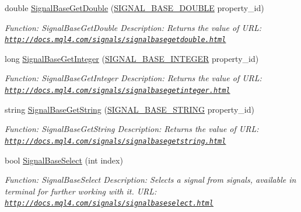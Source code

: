 \begin{DoxyCompactItemize}
double \hyperlink{class_m_q_l4_c_sharp_1_1_base_1_1_m_q_l_base_a75263c5390bf4f75c049212f66ae7d75}{Signal\+Base\+Get\+Double} (\hyperlink{namespace_m_q_l4_c_sharp_1_1_base_1_1_enums_ac14c82f52744d1785a379103a37ba46e}{S\+I\+G\+N\+A\+L\+\_\+\+B\+A\+S\+E\+\_\+\+D\+O\+U\+B\+LE} property\+\_\+id)
\begin{DoxyCompactList}\small\item\em Function\+: Signal\+Base\+Get\+Double Description\+: Returns the value of U\+RL\+: \href{http://docs.mql4.com/signals/signalbasegetdouble.html}{\tt http\+://docs.\+mql4.\+com/signals/signalbasegetdouble.\+html} \end{DoxyCompactList}\item 
long \hyperlink{class_m_q_l4_c_sharp_1_1_base_1_1_m_q_l_base_ae5f293ada0ea19c739982db32e8a2e27}{Signal\+Base\+Get\+Integer} (\hyperlink{namespace_m_q_l4_c_sharp_1_1_base_1_1_enums_a4ee390ea60dc6bc6c6ae5e177d6d4643}{S\+I\+G\+N\+A\+L\+\_\+\+B\+A\+S\+E\+\_\+\+I\+N\+T\+E\+G\+ER} property\+\_\+id)
\begin{DoxyCompactList}\small\item\em Function\+: Signal\+Base\+Get\+Integer Description\+: Returns the value of U\+RL\+: \href{http://docs.mql4.com/signals/signalbasegetinteger.html}{\tt http\+://docs.\+mql4.\+com/signals/signalbasegetinteger.\+html} \end{DoxyCompactList}\item 
string \hyperlink{class_m_q_l4_c_sharp_1_1_base_1_1_m_q_l_base_a3e561df72ed53b72f1958f6c0237ad66}{Signal\+Base\+Get\+String} (\hyperlink{namespace_m_q_l4_c_sharp_1_1_base_1_1_enums_a8a930a0524996541c8f8cf767faa0370}{S\+I\+G\+N\+A\+L\+\_\+\+B\+A\+S\+E\+\_\+\+S\+T\+R\+I\+NG} property\+\_\+id)
\begin{DoxyCompactList}\small\item\em Function\+: Signal\+Base\+Get\+String Description\+: Returns the value of U\+RL\+: \href{http://docs.mql4.com/signals/signalbasegetstring.html}{\tt http\+://docs.\+mql4.\+com/signals/signalbasegetstring.\+html} \end{DoxyCompactList}\item 
bool \hyperlink{class_m_q_l4_c_sharp_1_1_base_1_1_m_q_l_base_a8bc36cd28aac4fac0ea9941370a33f77}{Signal\+Base\+Select} (int index)
\begin{DoxyCompactList}\small\item\em Function\+: Signal\+Base\+Select Description\+: Selects a signal from signals, available in terminal for further working with it. U\+RL\+: \href{http://docs.mql4.com/signals/signalbaseselect.html}{\tt http\+://docs.\+mql4.\+com/signals/signalbaseselect.\+html} \end{DoxyCompactList}\item 

\end{DoxyCompactItemize}
